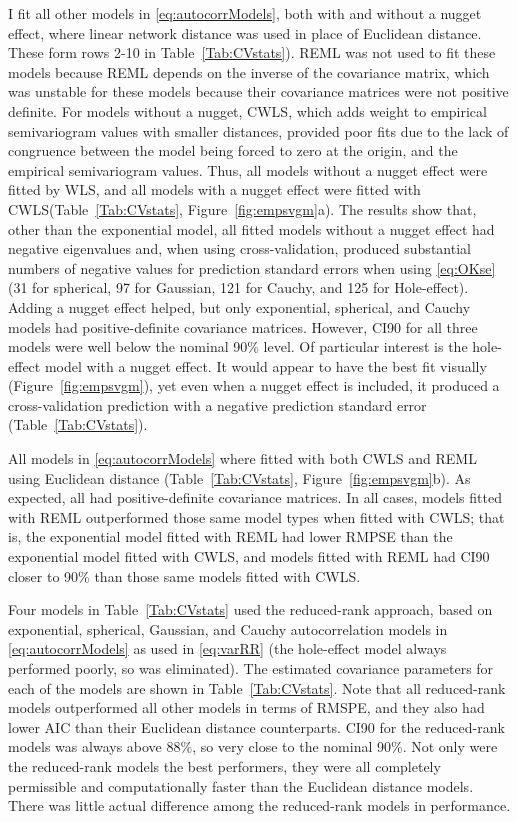 I fit all other models in \ref{eq:autocorrModels}, both with and without a nugget effect, where linear network distance was used in place of Euclidean distance.  These form rows 2-10 in Table~\ref{Tab:CVstats}). REML was not used to fit these models because REML depends on the inverse of the covariance matrix, which was unstable for these models because their covariance matrices were not positive definite. For models without a nugget, CWLS, which adds weight to empirical semivariogram values with smaller distances, provided poor fits due to the lack of congruence between the model being forced to zero at the origin, and the empirical semivariogram values.  Thus, all models without a nugget effect were fitted by WLS, and all models with a nugget effect were fitted with CWLS(Table~\ref{Tab:CVstats}, Figure~\ref{fig:empsvgm}a). The results show that, other than the exponential model, all fitted models without a nugget effect had negative eigenvalues and, when using cross-validation, produced substantial numbers of negative values for prediction standard errors when using \ref{eq:OKse} (31 for spherical, 97 for Gaussian, 121 for Cauchy, and 125 for Hole-effect).  Adding a nugget effect helped, but only exponential, spherical, and Cauchy models had positive-definite covariance matrices.  However, CI90 for all three models were well below the nominal 90\% level.  Of particular interest is the hole-effect model with a nugget effect. It would appear to have the best fit visually (Figure~\ref{fig:empsvgm}), yet even when a nugget effect is included, it produced a cross-validation prediction with a negative prediction standard error (Table~\ref{Tab:CVstats}).

All models in \ref{eq:autocorrModels} where fitted with both CWLS and REML using Euclidean distance (Table~\ref{Tab:CVstats}, Figure~\ref{fig:empsvgm}b).  As expected, all had positive-definite covariance matrices.  In all cases, models fitted with REML outperformed those same model types when fitted with CWLS; that is, the exponential model fitted with REML had lower RMPSE than the exponential model fitted with CWLS, and models fitted with REML had CI90 closer to 90\% than those same models fitted with CWLS.

Four models in Table~\ref{Tab:CVstats} used the reduced-rank approach, based on exponential, spherical, Gaussian, and Cauchy autocorrelation models in \ref{eq:autocorrModels} as used in \ref{eq:varRR} (the hole-effect model always performed poorly, so was eliminated).  The estimated covariance parameters for each of the models are shown in Table~\ref{Tab:CVstats}.  Note that all reduced-rank models outperformed all other models in terms of RMSPE, and they also had lower AIC than their Euclidean distance counterparts.  CI90 for the reduced-rank models was always above 88\%, so very close to the nominal 90\%. Not only were the reduced-rank models the best performers, they were all completely permissible and computationally faster than the Euclidean distance models.  There was little actual difference among the reduced-rank models in performance.  

